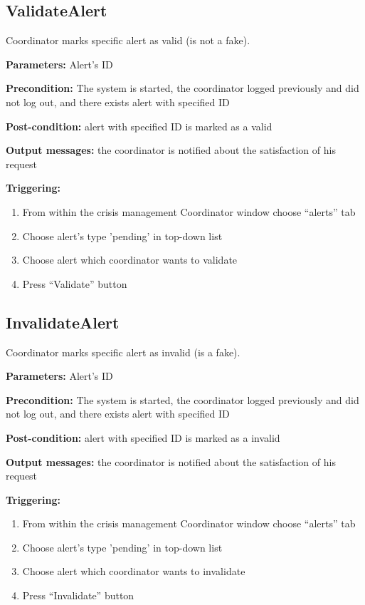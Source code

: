 \subsection{ValidateAlert}

Coordinator marks specific alert as valid (is not a fake).

\begin{description}

\item \textbf{Parameters:} Alert's ID
\item \textbf{Precondition:} The system is started, the coordinator logged
previously and did not log out, and there exists alert with specified ID
\item \textbf{Post-condition:} alert with specified ID is marked as a valid
\item \textbf{Output messages:} the coordinator is notified about the
satisfaction of his request

\item \textbf{Triggering:}
\begin{enumerate}
\item From within the crisis management Coordinator window choose ``alerts'' tab
\item Choose alert's type 'pending' in top-down list
\item Choose alert which coordinator wants to validate
\item Press ``Validate'' button
\end{enumerate}

\end{description}

\subsection{InvalidateAlert}

Coordinator marks specific alert as invalid (is a fake).

\begin{description}

\item \textbf{Parameters:} Alert's ID
\item \textbf{Precondition:} The system is started, the coordinator logged
previously and did not log out, and there exists alert with specified ID
\item \textbf{Post-condition:} alert with specified ID is marked as a invalid
\item \textbf{Output messages:} the coordinator is notified about the
satisfaction of his request

\item \textbf{Triggering:}
\begin{enumerate}
\item From within the crisis management Coordinator window choose ``alerts'' tab
\item Choose alert's type 'pending' in top-down list
\item Choose alert which coordinator wants to invalidate
\item Press ``Invalidate'' button
\end{enumerate}

\end{description}

